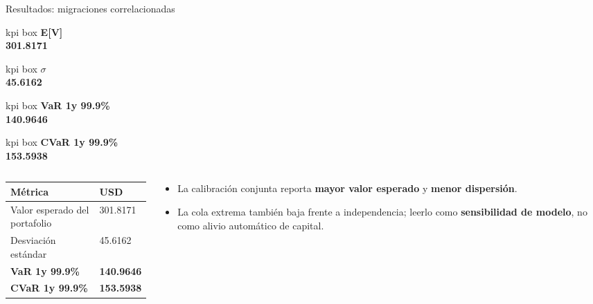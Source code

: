 \documentclass[aspectratio=169,10pt]{beamer}
\newcommand{\smallhead}[1]{\vspace{0.08cm}{\color{udlapblue}\textbf{#1}}\par\vspace{0.03cm}}
\newcommand{\kpi}[2]{%
  \begin{beamercolorbox}[wd=.92\linewidth,sep=0.45ex,rounded=true,center]{kpi box}
    {\scriptsize\textbf{#1}}\\[1pt]
    {\normalsize\textbf{#2}}
  \end{beamercolorbox}
}
\newcommand{\varlabel}[1]{{\color{alertred}\textbf{#1}}}
\newcommand{\cvarlabel}[1]{{\color{udlapblue}\textbf{#1}}}
\begin{document}
\begin{frame}{Resultados: migraciones correlacionadas}
\small
\centering
\begin{minipage}[t]{0.46\linewidth}\centering\kpi{E[V]}{301.8171}\end{minipage}\hfill
\begin{minipage}[t]{0.46\linewidth}\centering\kpi{$\sigma$}{45.6162}\end{minipage}

\vspace{0.14cm}

\begin{minipage}[t]{0.46\linewidth}\centering\kpi{VaR 1y 99.9\%}{140.9646}\end{minipage}\hfill
\begin{minipage}[t]{0.46\linewidth}\centering\kpi{CVaR 1y 99.9\%}{153.5938}\end{minipage}

\vspace{0.22cm}
\begin{columns}[T,onlytextwidth]
  \begin{column}{0.50\textwidth}
    \footnotesize
    \begin{tabular}{L{2.8cm}R{2.1cm}}
      \toprule
      \textbf{M\'etrica} & \textbf{USD} \\
      \midrule
      Valor esperado del portafolio & 301.8171 \\
      Desviaci\'on est\'andar & 45.6162 \\
      \varlabel{VaR 1y 99.9\%} & \varlabel{140.9646} \\
      \cvarlabel{CVaR 1y 99.9\%} & \cvarlabel{153.5938} \\
      \bottomrule
    \end{tabular}
  \end{column}
    \begin{column}{0.43\textwidth}
      \smallhead{Lectura}
      \begin{itemize}
        \item La calibraci\'on conjunta reporta \textbf{mayor valor esperado} y \textbf{menor dispersi\'on}.
        \item La cola extrema tambi\'en baja frente a independencia; leerlo como
        \textbf{sensibilidad de modelo}, no como alivio autom\'atico de capital.
      \end{itemize}
    \end{column}
  \end{columns}
  \end{frame}
\end{document}
